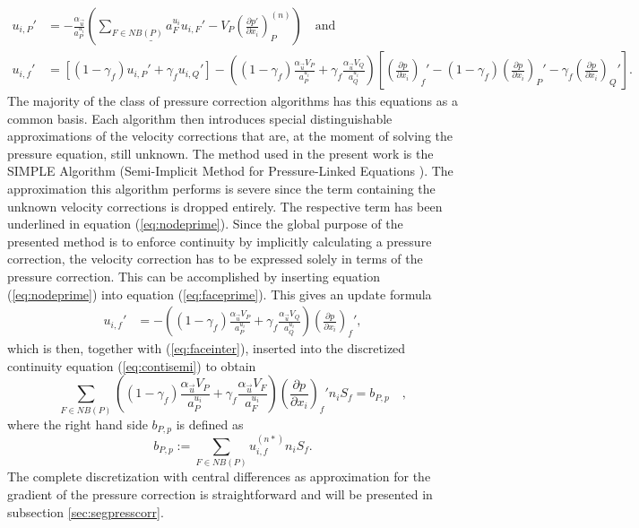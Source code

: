 \begin{align}
  \label{eq:nodeprime}
  u_{i,P}' 
  &=  
  - \frac{\alpha_{\vec{u}}}{a_P^{u_i}} \left(\underline{\sum_{F \in NB(P)} a_F^{u_i} u_{i,F}'}
  - V_P\left(\frac{\partial p'}{\partial x_i}\right)_P^{(n)} \right) \quad \text{and}\\[1em]
  \label{eq:faceprime}
  u_{i,f}' 
  &= 
  \left[\left(1 - \gamma_f\right) u_{i,P}' + \gamma_f u_{i,Q}' \right] 
  - 
  \left(\left(1 - \gamma_f\right) \frac{\alpha_\vec{u} V_P}{a_P^{u_i}} + \gamma_f \frac{\alpha_\vec{u} V_Q}{a_Q^{u_i}}\right)
  \left[ 
  \left(\frac{\partial p}{\partial x_i}\right)_f' 
  - \left( 1 - \gamma_f \right) \left( \frac{\partial p}{\partial x_i} \right)_P' 
  - \gamma_f \left(\frac{\partial p}{\partial x_i}\right)_Q' 
  \right].
\end{align}
The majority of the class of pressure correction algorithms has this equations as a common basis. Each algorithm then introduces special distinguishable approximations of the velocity corrections that are, at the moment of solving the pressure equation, still unknown. The method used in the present work is the SIMPLE Algorithm (Semi-Implicit Method for Pressure-Linked Equations \cite{patankar72}). The approximation this algorithm performs is severe since the term containing the unknown velocity corrections is dropped entirely. The respective term has been underlined in equation (\ref{eq:nodeprime}). Since the global purpose of the presented method is to enforce continuity by implicitly calculating a pressure correction, the velocity correction has to be expressed solely in terms of the pressure correction. This can be accomplished by inserting equation (\ref{eq:nodeprime}) into equation (\ref{eq:faceprime}). This gives an update formula
\begin{align}
  u_{i,f}' 
  &= 
  - \left(\left(1 - \gamma_f\right) \frac{\alpha_\vec{u} V_P}{a_P^{u_i}} + \gamma_f \frac{\alpha_\vec{u} V_Q}{a_Q^{u_i}}\right)
  \left(\frac{\partial p}{\partial x_i}\right)_f',
\end{align}
which is then, together with (\ref{eq:faceinter}), inserted into the discretized continuity equation (\ref{eq:contisemi}) to obtain
\begin{equation}
  \label{eq:presscorr}
  \sum_{F \in NB(P)} \left(\left(1 - \gamma_f\right) \frac{\alpha_\vec{u} V_P}{a_P^{u_i}} + \gamma_f \frac{\alpha_\vec{u} V_F}{a_F^{u_i}}\right)
  \left(\frac{\partial p}{\partial x_i}\right)_f' n_i S_f
  = b_{P,p}
  \quad,
\end{equation}
where the right hand side \(b_{P,p}\) is defined as
\begin{equation}
  \label{eq:presscorrb}
  b_{P,p} := \sum_{F \in NB(P)} u_{i,f}^{(n*)} n_i S_f.
\end{equation}
The complete discretization with central differences as approximation for the gradient of the pressure correction is straightforward and will be presented in subsection \ref{sec:segpresscorr}.

